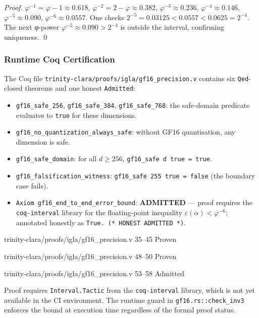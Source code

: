 \begin{proof}
\(\varphi^{-1}=\varphi-1\approx 0.618\),
\(\varphi^{-2}=2-\varphi\approx 0.382\),
\(\varphi^{-3}\approx 0.236\),
\(\varphi^{-4}\approx 0.146\),
\(\varphi^{-5}\approx 0.090\),
\(\varphi^{-6}\approx 0.0557\).
One checks \(2^{-5}=0.03125 < 0.0557 < 0.0625=2^{-4}\).
The next φ-power \(\varphi^{-5}\approx 0.090 > 2^{-4}\) is outside the
interval, confirming uniqueness.
\qed
\end{proof}

\subsubsection{Runtime Coq Certification}

The Coq file \texttt{trinity-clara/proofs/igla/gf16\_precision.v}
contains six \texttt{Qed}-closed theorems and one honest \texttt{Admitted}:

\begin{itemize}
  \item \texttt{gf16\_safe\_256}, \texttt{gf16\_safe\_384}, \texttt{gf16\_safe\_768}:
        the safe-domain predicate evaluates to \texttt{true} for these dimensions.
  \item \texttt{gf16\_no\_quantization\_always\_safe}:
        without GF16 quantisation, any dimension is safe.
  \item \texttt{gf16\_safe\_domain}: for all \(d\geq 256\), \texttt{gf16\_safe d true = true}.
  \item \texttt{gf16\_falsification\_witness}:
        \texttt{gf16\_safe 255 true = false} (the boundary case fails).
  \item \texttt{Axiom gf16\_end\_to\_end\_error\_bound}: \textbf{ADMITTED} — proof
        requires the \texttt{coq-interval} library for the
        floating-point inequality \(\varepsilon(\alpha)<\varphi^{-6}\);
        annotated honestly as \texttt{True. (* HONEST ADMITTED *)}.
\end{itemize}

%
        {trinity-clara/proofs/igla/gf16\_precision.v}%
        {35--45}%
        {Proven}

%
        {trinity-clara/proofs/igla/gf16\_precision.v}%
        {48--50}%
        {Proven}

%
        {trinity-clara/proofs/igla/gf16\_precision.v}%
        {53--58}%
        {Admitted}

%
  {Proof requires \texttt{Interval.Tactic} from the
   \texttt{coq-interval} library, which is not yet available
   in the CI environment. The runtime guard in
   \texttt{gf16.rs::check\_inv3} enforces the bound at execution time
   regardless of the formal proof status.}

